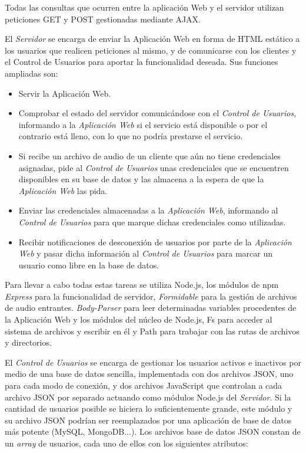 Todas las consultas que ocurren entre la aplicación Web y el servidor utilizan peticiones GET y POST gestionadas mediante AJAX.

El \emph{Servidor} se encarga de enviar la Aplicación Web en forma de HTML estático a los usuarios que realicen peticiones al mismo, y de comunicarse con los clientes y el Control de Usuarios para aportar la funcionalidad deseada. Sus funciones ampliadas son:

\begin{itemize}
\item Servir la Aplicación Web.
\item Comprobar el estado del servidor comunicándose con el \emph{Control de Usuarios}, informando a la \emph{Aplicación Web} si el servicio está disponible o por el contrario está lleno, con lo que no podría prestarse el servicio.
\item Si recibe un archivo de audio de un cliente que aún no tiene credenciales asignadas, pide al \emph{Control de Usuarios} unas credenciales que se encuentren disponibles en su base de datos y las almacena a la espera de que la \emph{Aplicación Web} las pida.
\item Enviar las credenciales almacenadas a la \emph{Aplicación Web}, informando al \emph{Control de Usuarios} para que marque dichas credenciales como utilizadas.
\item Recibir notificaciones de desconexión de usuarios por parte de la \emph{Aplicación Web} y pasar dicha información al \emph{Control de Usuarios} para marcar un usuario como libre en la base de datos.
\end{itemize}

Para llevar a cabo todas estas tareas se utiliza Node.js, los módulos de npm \emph{Express} para la funcionalidad de servidor, \emph{Formidable} para la gestión de archivos de audio entrantes. \emph{Body-Parser} para leer determinadas variables procedentes de la Aplicación Web y los módulos del núcleo de Node.js, Fs para acceder al sistema de archivos y escribir en él y Path para trabajar con las rutas de archivos y directorios.

El \emph{Control de Usuarios} se encarga de gestionar los usuarios activos e inactivos por medio de una base de datos sencilla, implementada con dos archivos JSON, uno para cada modo de conexión, y dos archivos JavaScript que controlan a cada archivo JSON por separado actuando como módulos Node.js del \emph{Servidor}. Si la cantidad de usuarios posible se hiciera lo suficientemente grande, este módulo y su archivo JSON podrían ser reemplazados por una aplicación de base de datos más potente (MySQL, MongoDB...). Los archivos base de datos JSON constan de un \emph{array} de usuarios, cada uno de ellos con los siguientes atributos:

